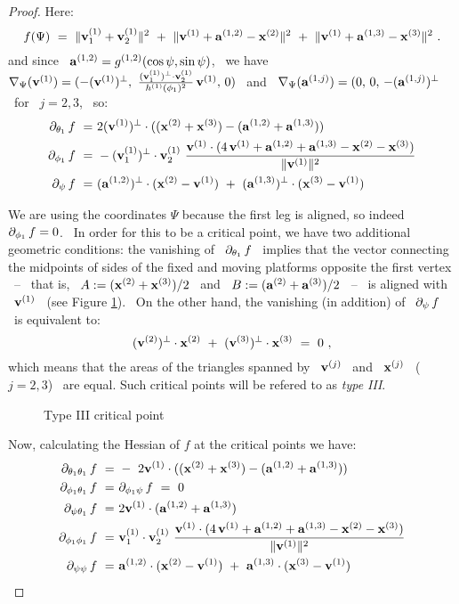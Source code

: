 \begin{proof}
Here:
%
$$
f(\Psi)~=~\|\vj{1}_{1}+\vj{1}_{2}\|^{2}
~+~\|\vj{1}+\aj{1,2}-\xj{2}\|^{2}~+~\|\vj{1}+\aj{1,3}-\xj{3}\|^{2}~.
$$
%
and since \ $\aj{1,2}=\gj{1,2}(\cos\psi,\sin\psi)$, \ we have \
$\nabla_{\Psi}(\vj{1})=
(-\vp{1},~\frac{\vpp{1}}{\hj{1}(\phi_{1})^{2}}\,\vj{1},\,0)$ \ and \
$\nabla_{\Psi}(\aj{1,j})=(0,\,0,\,-\ap{j}$ \ for \ $j=2,3$, \ so:
%
\begin{equation}
%
\begin{split}
%
\dif{f}{\theta_{1}}~=&~
2\vp{1}\cdot((\xj{2}+\xj{3})-(\aj{1,2}+\aj{1,3}))\\
%
\dif{f}{\phi_{1}}~=&~
-\vpp{1}\ \frac{\vj{1}\cdot(4\,\vj{1}+\aj{1,2}+\aj{1,3}-\xj{2}-\xj{3})}
{\|\vj{1}\|^{2}}\\
%
\dif{f}{\psi}~
=&~\ap{2}\cdot(\xj{2}-\vj{1})~+~\ap{3}\cdot(\xj{3}-\vj{1})
%
\end{split}
%
\end{equation}

We are using the coordinates $\Psi$ because the first leg is aligned,
so indeed \ $\dif{f}{\phi_{1}}=0$. \ In order for this to be a
critical point, we have two additional geometric conditions: the vanishing of \
$\dif{f}{\theta_{1}}$ \ implies that the vector
connecting the midpoints of sides of the fixed and moving platforms
opposite the first vertex \ -- \ that is, \
$A:=(\xj{2}+\xj{3})/2$ \ and \ $B:=(\aj{2}+\aj{3})/2$ \ -- \ is aligned
with \ $\vj{1}$ \ (see Figure \ref{fcaseIII}). \ On the other hand,
the vanishing (in addition) of \ $\dif{f}{\psi}$ \ is equivalent to:
%
\begin{equation}\label{eqcaseiii}
%
\vp{2}\cdot\xj{2}~+~\vp{3}\cdot\xj{3}~=~0~,
%
\end{equation}
%
which means that the areas of the triangles spanned by \ $\vj{j}$ \
and \ $\xj{j}$ \ ($j=2,3$) \ are equal. Such critical points
will be refered to as \emph{type III}.

\begin{figure}[htbp]
\begin{center}
\epsfysize=5cm %
\leavevmode {} \caption{Type III
critical point}\label{fcaseIII}
\end{center}
\end{figure}

Now, calculating the Hessian of $f$ at the critical points we have:
%
\begin{equation*}
%
\begin{split}
%
\diff{f}{\theta_{1}\theta_{1}}~=&~
-~2\vj{1}\cdot((\xj{2}+\xj{3})-(\aj{1,2}+\aj{1,3}))\\
%
\diff{f}{\phi_{1}\theta_{1}}~=&~\diff{f}{\phi_{1}\psi}~=~0\\
%
\diff{f}{\psi\theta_{1}}~=&~2\vj{1}\cdot(\aj{1,2}+\aj{1,3})\\
%
\diff{f}{\phi_{1}\phi_{1}}~=&~
\vj{1}_{1}\cdot\vj{1}_{2}\
\frac{\vj{1}\cdot(4\,\vj{1}+\aj{1,2}+\aj{1,3}-\xj{2}-\xj{3})}{\|\vj{1}\|^{2}}\\
%
\diff{f}{\psi\psi}~=&~\aj{1,2}\cdot(\xj{2}-\vj{1})~+~\aj{1,3}\cdot(\xj{3}-\vj{1})
%
\end{split}
%
\end{equation*}


\end{proof}
